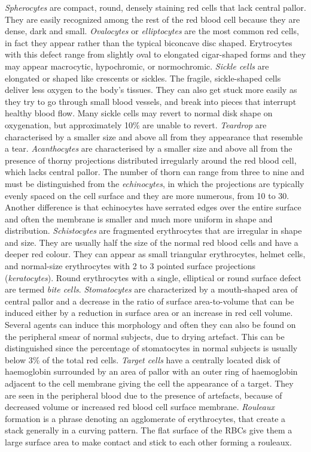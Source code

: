 \documentclass[final,a4paper,12pt,english]{UnicaPhdThesis3}
\begin{document}
	\textit{Spherocytes} are compact, round, densely staining red cells that lack central pallor. They are easily recognized among the rest of the red blood cell because they are dense, dark and small. \textit{Ovalocytes} or \textit{elliptocytes} are the most common red cells, in fact they appear rather than the typical biconcave disc shaped. Erytrocytes with this defect range from slightly oval to elongated cigar-shaped forms and they may appear macrocytic, hypochromic, or normochromic.  \textit{Sickle cells} are elongated or shaped like crescents or sickles. The fragile, sickle-shaped cells deliver less oxygen to the body's tissues. They can also get stuck more easily as they try to go through small blood vessels, and break into pieces that interrupt healthy blood flow. Many sickle cells may revert to normal disk shape on oxygenation, but approximately 10\% are unable to revert.
	\textit{Teardrop} are characterised by a smaller size and above all from they appearance that resemble a tear. \textit{Acanthocytes} are characterised by a smaller size and above all from the presence of thorny projections distributed irregularly around the red blood cell, which lacks central pallor. The number of thorn can range from three to nine and must be distinguished from the \textit{echinocytes}, in which the projections are typically evenly spaced on the cell surface and they are more numerous, from 10 to 30. Another difference is that echinocytes have serrated edges over the entire surface and often the membrane is smaller and much more uniform in shape and distribution. \textit{Schistocytes} are fragmented erythrocytes  that are irregular in shape and size. They are usually half the size of the normal red blood cells and have a deeper red colour. They can appear as small triangular erythrocytes, helmet cells, and normal-size erythrocytes with 2 to 3 pointed surface  projections (\textit{keratocytes}). Round erythrocytes with a single, elliptical or round surface defect are termed \textit{bite cells}. \textit{Stomatocytes} are characterized by a mouth-shaped area of central pallor and a decrease in the ratio of surface area-to-volume that can be induced either by a reduction in surface area or an increase in red cell volume. Several agents can induce this morphology and often they can also be found on the peripheral smear of normal subjects, due to drying artefact. This can be distinguished since the percentage of stomatocytes in normal subjects is usually below 3\% of the total red cells. \textit{Target cells} have a centrally located disk of haemoglobin surrounded by an area of pallor with an outer ring of haemoglobin adjacent to the cell membrane giving the cell the appearance of a target. They are seen in the peripheral blood due to the presence of artefacts, because of decreased volume or increased red blood cell surface membrane. \textit{Rouleaux} formation is a phrase denoting an agglomerate of erythrocytes, that create a stack generally in a curving pattern. The flat surface of the RBCs give them a large surface area to make contact and stick to each other forming a rouleaux. 
	
\end{document}
